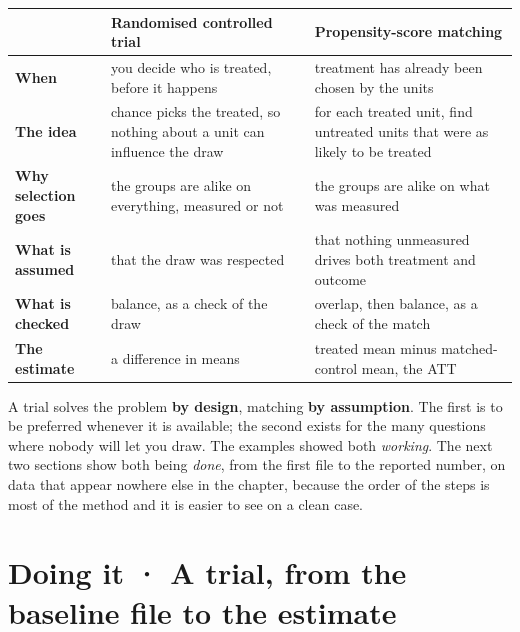 \documentclass[
  letterpaper,
  10pt,
  twoside,
  openright,
  numbers=noenddot,
  chapterprefix=true]{scrbook}
\begin{document}
\begin{longtable}[]{@{}
  >{\raggedright\arraybackslash}p{}
  >{\raggedright\arraybackslash}p{}
  >{\raggedright\arraybackslash}p{}@{}}
\toprule\noalign{}
\begin{minipage}[b]{\linewidth}\raggedright
\end{minipage} & \begin{minipage}[b]{\linewidth}\raggedright
Randomised controlled trial
\end{minipage} & \begin{minipage}[b]{\linewidth}\raggedright
Propensity-score matching
\end{minipage} \\
\midrule\noalign{}
\endhead
\bottomrule\noalign{}
\endlastfoot
\textbf{When} & you decide who is treated, before it happens & treatment
has already been chosen by the units \\
\textbf{The idea} & chance picks the treated, so nothing about a unit
can influence the draw & for each treated unit, find untreated units
that were as likely to be treated \\
\textbf{Why selection goes} & the groups are alike on everything,
measured or not & the groups are alike on what was measured \\
\textbf{What is assumed} & that the draw was respected & that nothing
unmeasured drives both treatment and outcome \\
\textbf{What is checked} & balance, as a check of the draw & overlap,
then balance, as a check of the match \\
\textbf{The estimate} & a difference in means & treated mean minus
matched-control mean, the ATT \\
\end{longtable}

A trial solves the problem \textbf{by design}, matching \textbf{by
assumption}. The first is to be preferred whenever it is available; the
second exists for the many questions where nobody will let you draw. The
examples showed both \emph{working}. The next two sections show both
being \emph{done}, from the first file to the reported number, on data
that appear nowhere else in the chapter, because the order of the steps
is most of the method and it is easier to see on a clean case.

\section{Doing it · A trial, from the baseline file to the
estimate}\label{doing-it-a-trial-from-the-baseline-file-to-the-estimate}
\end{document}
